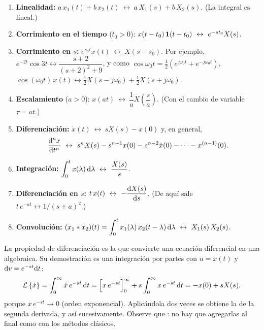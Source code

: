 \begin{enumerate}
  \item \textbf{Linealidad:} $a\,x_1(t)+b\,x_2(t)\ \leftrightarrow\ a\,X_1(s)+b\,X_2(s)$. (La integral es lineal.)
  \item \textbf{Corrimiento en el tiempo} ($t_0>0$): $x(t-t_0)\,\escalon(t-t_0)\ \leftrightarrow\ e^{-st_0}X(s)$.
  \item \textbf{Corrimiento en $s$:} $e^{s_0t}x(t)\ \leftrightarrow\ X(s-s_0)$. Por ejemplo, $e^{-2t}\cos3t\leftrightarrow\dfrac{s+2}{(s+2)^2+9}$, y como $\cos\omega_0t=\tfrac12(e^{j\omega_0t}+e^{-j\omega_0t})$, $\cos(\omega_0t)\,x(t)\leftrightarrow\tfrac12X(s-j\omega_0)+\tfrac12X(s+j\omega_0)$.
  \item \textbf{Escalamiento} ($a>0$): $x(at)\ \leftrightarrow\ \dfrac1a X\!\left(\dfrac sa\right)$. (Con el cambio de variable $\tau=at$.)
  \item \textbf{Diferenciación:} $\dot x(t)\ \leftrightarrow\ sX(s)-x(0)$ y, en general,
  \begin{equation}
    \frac{\dif^n x}{\dif t^n}\ \leftrightarrow\ s^nX(s)-s^{n-1}x(0)-s^{n-2}\dot x(0)-\cdots-x^{(n-1)}(0).
    \label{eq:po-derivada}
  \end{equation}
  \item \textbf{Integración:} $\displaystyle\int_0^t x(\lambda)\,\dif\lambda\ \leftrightarrow\ \frac{X(s)}{s}$.
  \item \textbf{Diferenciación en $s$:} $t\,x(t)\ \leftrightarrow\ -\dfrac{\mathrm{d} X(s)}{\mathrm{d} s}$. (De aquí sale $t\,e^{-at}\leftrightarrow1/(s+a)^2$.)
  \item \textbf{Convolución:} $\displaystyle (x_1*x_2)(t)=\int_0^t x_1(\lambda)\,x_2(t-\lambda)\,\dif\lambda\ \leftrightarrow\ X_1(s)\,X_2(s)$.
\end{enumerate}

La propiedad de diferenciación es la que convierte una ecuación diferencial en una algebraica. Su demostración es una integración por partes con $u=x(t)$ y $\mathrm{d} v=e^{-st}\mathrm{d} t$:
\[
  \mathcal{L}\left\{\dot x\right\}=\int_0^\infty \dot x\,e^{-st}\,\mathrm{d} t
  =\Bigl[x\,e^{-st}\Bigr]_0^\infty+s\int_0^\infty x\,e^{-st}\,\mathrm{d} t
  =-x(0)+sX(s),
\]
porque $x\,e^{-st}\to0$ (orden exponencial). Aplicándola dos veces se obtiene la de la segunda derivada, y así sucesivamente. Observe que : no hay que agregarlas al final como con los métodos clásicos.


